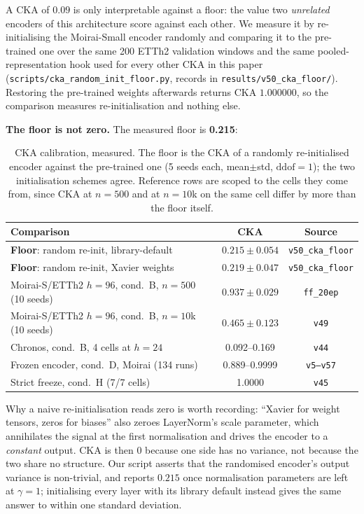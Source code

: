 A CKA of $0.09$ is only interpretable against a floor: the value two
\emph{unrelated} encoders of this architecture score against each other.  We
measure it by re-initialising the Moirai-Small encoder randomly and comparing it
to the pre-trained one over the same 200 ETTh2 validation windows and the same
pooled-representation hook used for every other CKA in this paper
(\texttt{scripts/cka\_random\_init\_floor.py}, records in
\texttt{results/v50\_cka\_floor/}).  Restoring the pre-trained weights afterwards
returns CKA $1.000000$, so the comparison measures re-initialisation and nothing
else.

\textbf{The floor is not zero.}  The measured floor is \textbf{0.215}:

\begin{table}[!htbp]
\centering
\caption{CKA calibration, measured.  The floor is the CKA of a randomly
re-initialised encoder against the pre-trained one (5 seeds each, mean$\pm$std,
$\text{ddof}{=}1$); the two initialisation schemes agree.  Reference rows are
scoped to the cells they come from, since CKA at $n{=}500$ and at $n{=}10$k on the
same cell differ by more than the floor itself.}
\label{tab:cka_calibration}
\small
\begin{tabular}{lcc}
\toprule
Comparison & CKA & Source \\
\midrule
\textbf{Floor}: random re-init, library-default & $\mathbf{0.215{\pm}0.054}$ & \texttt{v50\_cka\_floor} \\
\textbf{Floor}: random re-init, Xavier weights & $\mathbf{0.219{\pm}0.047}$ & \texttt{v50\_cka\_floor} \\
\midrule
Moirai-S/ETTh2 $h{=}96$, cond.\ B, $n{=}500$ (10 seeds) & $0.937{\pm}0.029$ & \texttt{ff\_20ep} \\
Moirai-S/ETTh2 $h{=}96$, cond.\ B, $n{=}10$k (10 seeds) & $0.465{\pm}0.123$ & \texttt{v49} \\
Chronos, cond.\ B, 4 cells at $h{=}24$ & 0.092--0.169 & \texttt{v44} \\
Frozen encoder, cond.\ D, Moirai (134 runs) & 0.889--0.9999 & \texttt{v5--v57} \\
Strict freeze, cond.\ H (7/7 cells) & 1.0000 & \texttt{v45} \\
\bottomrule
\end{tabular}
\end{table}

Why a naive re-initialisation reads zero is worth recording: ``Xavier for weight tensors, zeros for
biases'' also zeroes LayerNorm's scale parameter, which annihilates the signal at
the first normalisation and drives the encoder to a \emph{constant} output.  CKA
is then $0$ because one side has no variance, not because the two share no
structure.  Our script asserts that the randomised encoder's output variance is
non-trivial, and reports $0.215$ once normalisation parameters are left at
$\gamma{=}1$; initialising every layer with its library default instead gives the
same answer to within one standard deviation.

